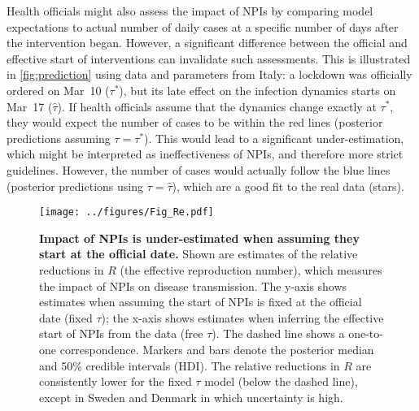 \documentclass[12pt]{extarticle}
\begin{document}
Health officials might also assess the impact of NPIs by comparing model expectations to actual number of daily cases at a specific number of days after the intervention began. 
However, a significant difference between the official and effective start of interventions can invalidate such assessments.
This is illustrated in \autoref{fig:prediction} using data and parameters from Italy: a lockdown was officially ordered on Mar~10 ($\tau^*$), but its late effect on the infection dynamics starts on Mar~17 ($\hat{\tau}$).
If health officials assume that the dynamics change exactly at $\tau^*$, they would expect the number of cases to be within the red lines (posterior predictions assuming $\tau=\tau^*$).
This would lead to a significant under-estimation, which might be interpreted as ineffectiveness of NPIs, and therefore more strict guidelines.
However, the number of cases would actually follow the blue lines (posterior predictions using $\tau=\hat{\tau}$), which are a good fit to the real data (stars).



\begin{figure}[h]
    \centering
	\texttt{[image: ../figures/Fig\_Re.pdf]}
    \caption{
    \textbf{Impact of NPIs is under-estimated when assuming they start at the official date.}
    Shown are estimates of the relative reductions in $R$ (the effective reproduction number), which measures the impact of NPIs on disease transmission.
     The y-axis shows estimates when assuming the start of NPIs is fixed at the official date (fixed $\tau$); the x-axis shows estimates when inferring the effective start of NPIs from the data (free $\tau$). The dashed line shows a one-to-one correspondence.
     Markers and bars denote the posterior median and 50\% credible intervals (HDI).
    The relative reductions in $R$ are consistently lower for the fixed $\tau$ model (below the dashed line), except in Sweden and Denmark in which uncertainty is high.
    } 
    \label{fig:Re}
\end{figure}
\end{document}
